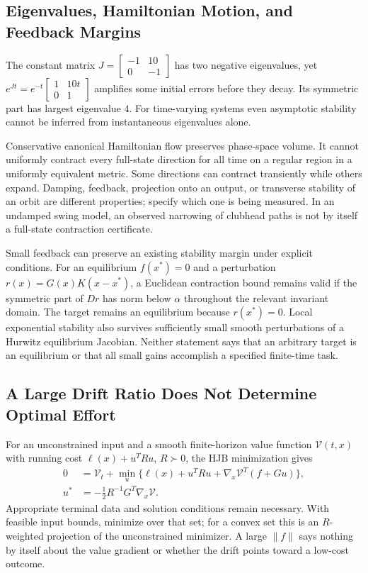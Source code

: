 \subsection{Eigenvalues, Hamiltonian Motion, and Feedback Margins}
The constant matrix $J=\left[\begin{smallmatrix}-1&10\\0&-1\end{smallmatrix}\right]$ has two negative eigenvalues, yet $e^{Jt}=e^{-t}\left[\begin{smallmatrix}1&10t\\0&1\end{smallmatrix}\right]$ amplifies some initial errors before they decay. Its symmetric part has largest eigenvalue $4$. For time-varying systems even asymptotic stability cannot be inferred from instantaneous eigenvalues alone.

Conservative canonical Hamiltonian flow preserves phase-space volume. It cannot uniformly contract every full-state direction for all time on a regular region in a uniformly equivalent metric. Some directions can contract transiently while others expand. Damping, feedback, projection onto an output, or transverse stability of an orbit are different properties; specify which one is being measured. In an undamped swing model, an observed narrowing of clubhead paths is not by itself a full-state contraction certificate.

Small feedback can preserve an existing stability margin under explicit conditions. For an equilibrium $f(x^*)=0$ and a perturbation $r(x)=G(x)K(x-x^*)$, a Euclidean contraction bound remains valid if the symmetric part of $D r$ has norm below $\alpha$ throughout the relevant invariant domain. The target remains an equilibrium because $r(x^*)=0$. Local exponential stability also survives sufficiently small smooth perturbations of a Hurwitz equilibrium Jacobian. Neither statement says that an arbitrary target is an equilibrium or that all small gains accomplish a specified finite-time task.

\subsection{A Large Drift Ratio Does Not Determine Optimal Effort}
For an unconstrained input and a smooth finite-horizon value function $\mathcal V(t,x)$ with running cost $\ell(x)+u^TRu$, $R\succ0$, the HJB minimization gives
\begin{equation}
\begin{aligned}
0&=\mathcal V_t+\min_u\{\ell(x)+u^TRu+\nabla_x\mathcal V^T(f+Gu)\},\\
u^*&=-\tfrac12R^{-1}G^T\nabla_x\mathcal V.
\end{aligned}
\label{eq:ch7:bellman}
\end{equation}
\label{eq:ch7:opt-cost}
\label{eq:ch7:optimal-input}
Appropriate terminal data and solution conditions remain necessary. With feasible input bounds, minimize over that set; for a convex set this is an $R$-weighted projection of the unconstrained minimizer. A large $\|f\|$ says nothing by itself about the value gradient or whether the drift points toward a low-cost outcome.

